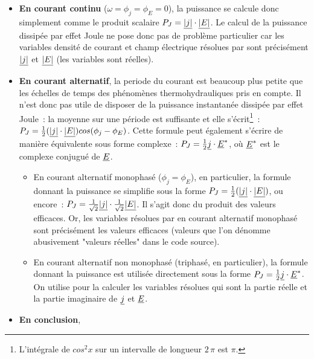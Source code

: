 \begin{itemize}

\item {\bf En courant continu} ($\omega=\phi_j=\phi_E=0$),
la puissance se calcule donc simplement comme
le produit scalaire $P_J=\underline{|j|}\cdot\underline{|E|}$.
Le calcul de la puissance
dissip\'ee par effet Joule ne pose donc pas de probl\`eme particulier
car les variables densit\'e de courant et champ \'electrique r\'esolues
par \CS sont pr\'ecis\'ement $\underline{|j|}$ et $\underline{|E|}$ (les variables sont r\'eelles).

\item {\bf En courant alternatif}, la periode du courant est beaucoup plus petite que
les \'echelles de temps des ph\'enom\`enes thermohydrauliques pris en compte.
Il n'est donc pas utile de disposer de la puissance instantan\'ee dissip\'ee
par effet Joule~: la moyenne sur une p\'eriode est suffisante et elle
s'\'ecrit\footnote{L'int\'egrale de $cos^2 x$ sur un intervalle de longueur
$2\,\pi$ est $\pi$.}~:
$P_J=\frac{1}{2}(\underline{|j|}\cdot\underline{|E|})cos(\phi_j-\phi_E)$. Cette formule
peut \'egalement s'\'ecrire de mani\`ere \'equivalente sous forme complexe~:
$P_J=\frac{1}{2}\underline{j}\cdot\underline{E}^*$, o\`u $\underline{E}^*$ est le complexe
conjugu\'e de $\underline{E}$.

  \begin{itemize}
  \item En courant alternatif monophas\'e ($\phi_j=\phi_E$), en particulier,
la formule donnant la puissance se simplifie sous la forme
$P_J=\frac{1}{2}(\underline{|j|}\cdot\underline{|E|})$, ou encore~:
$P_J=\frac{1}{\sqrt{2}}\underline{|j|}\cdot\frac{1}{\sqrt{2}}\underline{|E|}$.
Il s'agit donc du produit des valeurs efficaces. Or, les variables r\'esolues
par \CS en courant alternatif monophas\'e sont pr\'ecis\'ement les
valeurs efficaces (valeurs que l'on
d\'enomme abusivement "valeurs r\'eelles" dans le code source).

  \item En courant alternatif non monophas\'e (triphas\'e, en particulier),
la formule donnant la puissance est utilis\'ee directement sous la forme
$P_J=\frac{1}{2}\underline{j}\cdot\underline{E}^*$.
On utilise pour la calculer les variables r\'esolues qui sont
la partie r\'eelle et la partie imaginaire de $\underline{j}$ et $\underline{E}$.

  \end{itemize}

\item {\bf En conclusion},


\end{itemize}
